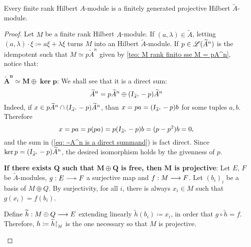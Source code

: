\begin{proposicao}\label{prop: M eh finitamente gerado projetivo}
Every finite rank Hilbert $A$-module is a finitely generated projective Hilbert $\widetilde A$-module.
\begin{proof}
Let $M$ be a finite rank Hilbert $A$-module. If $(a,\lambda) \in \widetilde A$, letting $(a,\lambda)\cdot \xi \coloneqq a\xi + \lambda\xi$ turns $M$ into an Hilbert $\widetilde A$-module. If $p\in \mathscr L({\widetilde{A}}^n)$ is the idempotent such that $M \simeq p{\widetilde{A}}^n$ given by \ref{teo: M rank finito sse M = pA^n}, notice that:
\begin{itroman}
    \item \ensuremath{\boldsymbol{{\widetilde{A}}^n \simeq M \oplus \ker p}}:  We shall see that it is a direct sum:
    \begin{equation}
    \label{eq: ~A^n is a direct summand}
        {{\widetilde{A}}}^n = p{{\widetilde{A}}}^n \oplus (\sub\Id{{\widetilde{A}}^n}-p){{\widetilde{A}}}^n
    \end{equation}
    Indeed, if $x \in p{\widetilde{A}}^n \cap (\sub\Id{{\widetilde{A}}^n}-p){{\widetilde{A}}}^n$, than $x = pa = (\sub\Id{{\widetilde{A}}^n}-p)b$ for some tuples $a, b$. Therefore
    \[
    x = pa = p(pa) = p(\sub\Id{{{\widetilde{A}}}^n}-p)b = (p - p^2)b = 0,
    \]
    and the sum in (\ref{eq: ~A^n is a direct summand}) is fact direct. Since $\ker p = (\sub\Id{{\widetilde{A}}^n}-p){\widetilde{A}}^n$, the desired isomorphism holds by the givenness of $p$.
    \item \label{item: M projetivo sse M oplus Q livre}\textbf{If there exists $\boldsymbol Q$ such that $\boldsymbol{M\oplus Q}$ is free, then $\boldsymbol M$ is projective}: Let $E$, $F$ be $\widetilde A$-modules, $g:E \longtwoheadrightarrow F$ a surjective map and $f:M \longrightarrow F$. Let $(b_i)_i$ be a basis of $M\oplus Q$. By surjectivity, for all $i$, there is always $x_i\in M$  such that $g(x_i) = f(b_i)$. 
    
    Define $\widetilde{h}:M\oplus Q \longrightarrow E$ extending linearly $\widetilde{h}(b_i) \coloneqq x_i$, in order that $g \circ \widetilde{h} = f$. Therefore, $h \coloneqq \widetilde{h} \sub{\restrita}{M}$ is the one necessary so that $M$ is projective.
    

\end{itroman}
\end{proof}
\end{proposicao}
